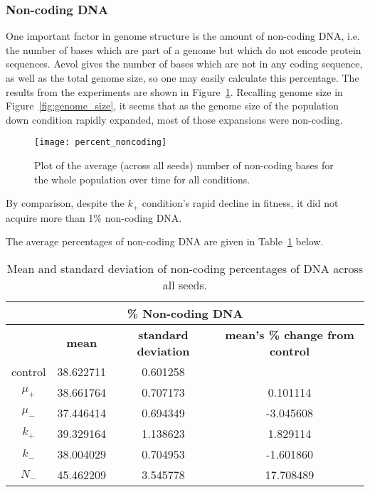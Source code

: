 \subsubsection{Non-coding DNA}
One important factor in genome structure is the amount of non-coding DNA, i.e. the number of bases which are part of a genome but which do not encode protein sequences. Aevol gives the number of bases which are not in any coding sequence, as well as the total genome size, so one may easily calculate this percentage. The results from the experiments are shown in Figure~\ref{fig:mean_non-coding_DNA}. Recalling genome size in Figure~\ref{fig:genome_size}, it seems that as the genome size of the population down condition rapidly expanded, most of those expansions were non-coding.
\begin{figure}[H]
	\centering
	\texttt{[image: percent\_noncoding]}
	\caption[Non-coding DNA]{Plot of the average (across all seeds) number of non-coding bases for the whole population over time for all conditions.}
	\label{fig:mean_non-coding_DNA}
\end{figure}
By comparison, despite the $k_+$ condition's rapid decline in fitness, it did not acquire more than 1\% non-coding DNA. 

The average percentages of non-coding DNA are given in Table~\ref{table:non-coding_DNA_mean_and_standard_deviation} below. 
\begin{table}[H]
	\begin{tabular}{|c|c|c|c|}
		\hline
		\multicolumn{4}{c}{\Large \textbf{\% Non-coding DNA}} \\
		\hline
		& \textbf{mean} & \textbf{standard deviation} & \textbf{mean's \% change from control} \\
		\hline \hline
		control & 38.622711 & 0.601258 & \textemdash \\ 
		\hline
		$\mu_+$ & 38.661764 & 0.707173 & 0.101114 \\ 
		\hline
		$\mu_-$ & 37.446414 & 0.694349 & -3.045608 \\ 
		\hline
		$k_+$ & 39.329164 & 1.138623 & 1.829114 \\ 
		\hline
		$k_-$ & 38.004029 & 0.704953 & -1.601860 \\ 
		\hline
		$N_-$ & 45.462209 & 3.545778 & 17.708489 \\ 
		\hline
	\end{tabular}
	\caption[Non-coding DNA mean and standard deviation]{Mean and standard deviation of non-coding percentages of DNA across all seeds.}
	\label{table:non-coding_DNA_mean_and_standard_deviation}
\end{table}

